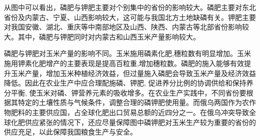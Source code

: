 从图中可以看出，磷肥与钾肥主要对个别集中的省份的影响较大。磷肥主要对东北省份及内蒙古、宁夏、山西影响较大，这可能与我国北方土地缺磷有关。钾肥主要对我国安徽、湖北、重庆等中南部地区及山西、陕西、内蒙古等北部省份影响较大。其中，磷肥与钾肥同时对内蒙古和山西玉米产量影响较大。

磷肥与钾肥对玉米产量的影响不同。玉米施用磷素化肥,穗粒数有明显增加。玉米施用钾素化肥增产的主要表现是提高百粒重,增加穗粒数\cite{施用氮磷钾肥对夏玉米产量和品质的影响}。磷肥的施入能够有效提升玉米产量，增加玉米种植经济效益，但过量施入磷肥会导致玉米产量及经济效益降低\cite{磷肥用量对玉米产量的影响}。因此在农业生产中应合理配施磷、钾肥, 促进养分比例的协调供给和保持养分平衡, 使玉米对磷、钾营养元素的吸收增多\cite{磷钾肥配合施用对玉米产量及养分吸收的影响}。在农业生产实践中，不同省份要根据其特定的土壤性质与气候条件，调整合理的磷钾肥使用量。而俄乌两国作为农作物肥料的主要供应国，占全球化肥出口贸易总额的近四分之一。在俄乌冲突导致全球化肥供应紧张的情况下，还应尽量保障图中磷钾肥对玉米生产较为重要的省份的供应充足，以此保障我国粮食生产与安全。





